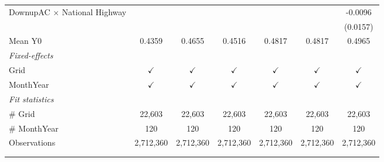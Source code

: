 \begin{table}[htbp]
\begin{tabular}{lcccccc}
      DownupAC $\times$ National Highway                         &               &               &               &               &               & -0.0096\\   
                                                                 &               &               &               &               &               & (0.0157)\\   
      \hline Mean Y0                                             & 0.4359        & 0.4655        & 0.4516        & 0.4817        & 0.4817        & 0.4965\\  
      \midrule
      \emph{Fixed-effects}\\
      Grid                                                       & $\checkmark$  & $\checkmark$  & $\checkmark$  & $\checkmark$  & $\checkmark$  & $\checkmark$\\   
      MonthYear                                                  & $\checkmark$  & $\checkmark$  & $\checkmark$  & $\checkmark$  & $\checkmark$  & $\checkmark$\\   
      \midrule
      \emph{Fit statistics}\\
      \# Grid                                                    & 22,603        & 22,603        & 22,603        & 22,603        & 22,603        & 22,603\\  
      \# MonthYear                                               & 120           & 120           & 120           & 120           & 120           & 120\\  
      Observations                                               & 2,712,360     & 2,712,360     & 2,712,360     & 2,712,360     & 2,712,360     & 2,712,360\\  
      \midrule \midrule
                                                                 &               &               &               &               &               &  \tabularnewline 
      \\
   \end{tabular}
\end{table}


